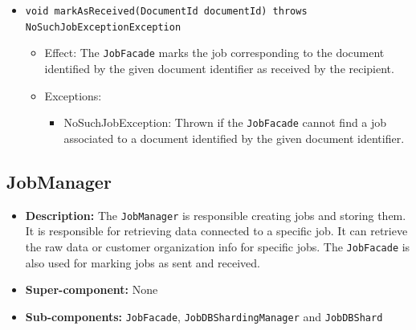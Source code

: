 \documentclass[a4paper,10pt]{article}
\begin{document}
\begin{itemize}
\begin{itemize}
    	\item \texttt{void markAsReceived(DocumentId documentId) throws NoSuchJobExceptionException}
    	\begin{itemize}
    		\item Effect: The \texttt{JobFacade} marks the job corresponding to the document identified by the given document identifier as received by the recipient.
    		\item Exceptions:
    		\begin{itemize}
    			\item NoSuchJobException: Thrown if the \texttt{JobFacade} cannot find a job associated to a document identified by the given document identifier.
    		\end{itemize}
    	\end{itemize}
    \end{itemize}
\end{itemize}

\subsection{JobManager}
\begin{itemize}
    \item \textbf{Description:} The \texttt{JobManager} is responsible creating jobs and storing them. It is responsible for retrieving data connected to a specific job. It can retrieve the raw data or customer organization info for specific jobs. The \texttt{JobFacade} is also used for marking jobs as sent and received.
    \item \textbf{Super-component:} None
    \item \textbf{Sub-components:} \texttt{JobFacade}, \texttt{JobDBShardingManager} and \texttt{JobDBShard}
\end{itemize}
\end{document}
